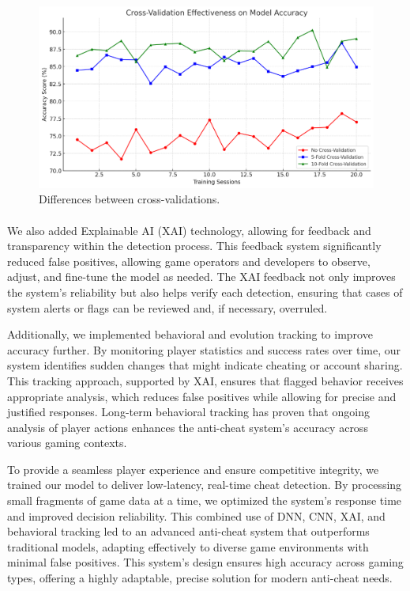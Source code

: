 \begin{figure}
\centering
\includegraphics[width=0.8\linewidth]{images/cross-validation.png}
\caption{\label{fig:crossvalidation}Differences between cross-validations.}
\end{figure}

\paragraph{}
We also added Explainable AI (XAI) technology, allowing for feedback and transparency within the detection process. This feedback system significantly reduced false positives, allowing game operators and developers to observe, adjust, and fine-tune the model as needed. The XAI feedback not only improves the system’s reliability but also helps verify each detection, ensuring that cases of system alerts or flags can be reviewed and, if necessary, overruled.

Additionally, we implemented behavioral and evolution tracking to improve accuracy further. By monitoring player statistics and success rates over time, our system identifies sudden changes that might indicate cheating or account sharing. This tracking approach, supported by XAI, ensures that flagged behavior receives appropriate analysis, which reduces false positives while allowing for precise and justified responses. Long-term behavioral tracking has proven that ongoing analysis of player actions enhances the anti-cheat system’s accuracy across various gaming contexts.

To provide a seamless player experience and ensure competitive integrity, we trained our model to deliver low-latency, real-time cheat detection. By processing small fragments of game data at a time, we optimized the system’s response time and improved decision reliability. This combined use of DNN, CNN, XAI, and behavioral tracking led to an advanced anti-cheat system that outperforms traditional models, adapting effectively to diverse game environments with minimal false positives. This system’s design ensures high accuracy across gaming types, offering a highly adaptable, precise solution for modern anti-cheat needs.


